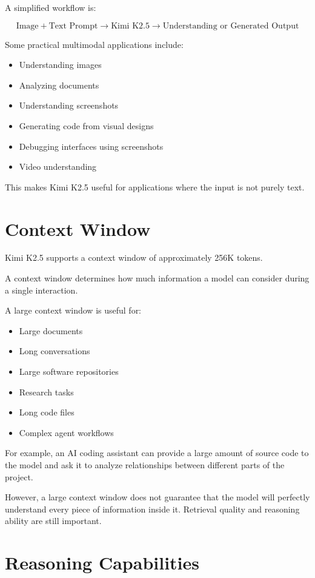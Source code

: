 \documentclass{article}
\begin{document}
A simplified workflow is:

\[
\text{Image} + \text{Text Prompt}
\rightarrow
\text{Kimi K2.5}
\rightarrow
\text{Understanding or Generated Output}
\]

Some practical multimodal applications include:

\begin{itemize}
\item Understanding images
\item Analyzing documents
\item Understanding screenshots
\item Generating code from visual designs
\item Debugging interfaces using screenshots
\item Video understanding
\end{itemize}

This makes Kimi K2.5 useful for applications where the input is not purely text.

\section{Context Window}

Kimi K2.5 supports a context window of approximately 256K tokens.

A context window determines how much information a model can consider during a single interaction.

A large context window is useful for:

\begin{itemize}
\item Large documents
\item Long conversations
\item Large software repositories
\item Research tasks
\item Long code files
\item Complex agent workflows
\end{itemize}

For example, an AI coding assistant can provide a large amount of source code to the model and ask it to analyze relationships between different parts of the project.

However, a large context window does not guarantee that the model will perfectly understand every piece of information inside it. Retrieval quality and reasoning ability are still important.

\section{Reasoning Capabilities}
\end{document}
